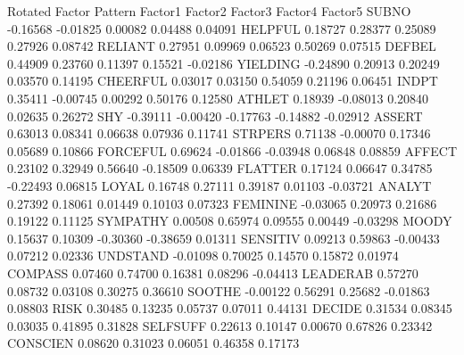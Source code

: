 \documentclass{article}
\begin{document}
\begin{Woutput}
                                 Rotated Factor Pattern
                 Factor1         Factor2         Factor3         Factor4         Factor5
SUBNO           -0.16568        -0.01825         0.00082         0.04488         0.04091
HELPFUL          0.18727         0.28377         0.25089         0.27926         0.08742
RELIANT          0.27951         0.09969         0.06523         0.50269         0.07515
DEFBEL           0.44909         0.23760         0.11397         0.15521        -0.02186
YIELDING        -0.24890         0.20913         0.20249         0.03570         0.14195
CHEERFUL         0.03017         0.03150         0.54059         0.21196         0.06451
INDPT            0.35411        -0.00745         0.00292         0.50176         0.12580
ATHLET           0.18939        -0.08013         0.20840         0.02635         0.26272
SHY             -0.39111        -0.00420        -0.17763        -0.14882        -0.02912
ASSERT           0.63013         0.08341         0.06638         0.07936         0.11741
STRPERS          0.71138        -0.00070         0.17346         0.05689         0.10866
FORCEFUL         0.69624        -0.01866        -0.03948         0.06848         0.08859
AFFECT           0.23102         0.32949         0.56640        -0.18509         0.06339
FLATTER          0.17124         0.06647         0.34785        -0.22493         0.06815
LOYAL            0.16748         0.27111         0.39187         0.01103        -0.03721
ANALYT           0.27392         0.18061         0.01449         0.10103         0.07323
FEMININE        -0.03065         0.20973         0.21686         0.19122         0.11125
SYMPATHY         0.00508         0.65974         0.09555         0.00449        -0.03298
MOODY            0.15637         0.10309        -0.30360        -0.38659         0.01311
SENSITIV         0.09213         0.59863        -0.00433         0.07212         0.02336
UNDSTAND        -0.01098         0.70025         0.14570         0.15872         0.01974
COMPASS          0.07460         0.74700         0.16381         0.08296        -0.04413
LEADERAB         0.57270         0.08732         0.03108         0.30275         0.36610
SOOTHE          -0.00122         0.56291         0.25682        -0.01863         0.08803
RISK             0.30485         0.13235         0.05737         0.07011         0.44131
DECIDE           0.31534         0.08345         0.03035         0.41895         0.31828
SELFSUFF         0.22613         0.10147         0.00670         0.67826         0.23342
CONSCIEN         0.08620         0.31023         0.06051         0.46358         0.17173

\end{Woutput}
\end{document}
